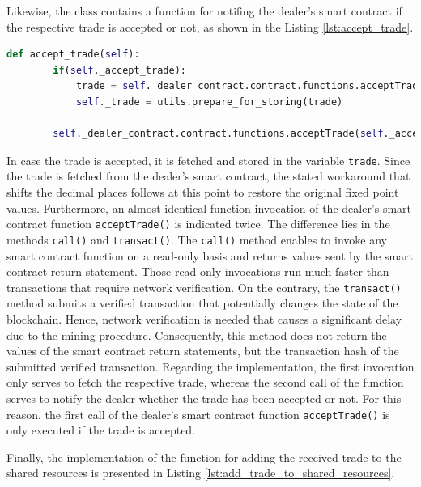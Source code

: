 Likewise, the class contains a function for notifing the dealer's smart contract if the respective trade is accepted or not,
as shown in the Listing \ref{lst:accept_trade}.

\begin{lstlisting}[float=htbp, label=lst:accept_trade, caption=Notification of trade acceptance, language=Python]
    def accept_trade(self):
        if(self._accept_trade):
            trade = self._dealer_contract.contract.functions.acceptTrade(self._accept_trade).call({'from': self._account_address})
            self._trade = utils.prepare_for_storing(trade)

        self._dealer_contract.contract.functions.acceptTrade(self._accept_trade).transact({'from': self._account_address})

\end{lstlisting}

In case the trade is accepted, it is fetched and stored in the variable \verb|trade|. Since the trade 
is fetched from the dealer's smart contract, the stated workaround that shifts the decimal places follows
at this point to restore the original fixed point values.
Furthermore, an almost identical function invocation of the dealer's smart contract 
function \verb|acceptTrade()| is indicated twice. 
The difference lies in the methods \verb|call()| and \verb|transact()|. 
The \verb|call()| method enables to invoke any smart contract function on a read-only basis
and returns values sent by the smart contract return statement. 
Those read-only invocations run much faster than transactions that require network verification.
On the contrary, the \verb|transact()| method submits a verified transaction that potentially changes the state of the blockchain. 
Hence, network verification is needed that causes a significant delay due to the mining procedure.
Consequently, this method does not return the values of the smart contract return statements,
but the transaction hash of the submitted verified transaction.
Regarding the implementation, the first invocation only serves to fetch the respective trade,
whereas the second call of the function serves to notify the dealer whether the trade has been accepted or not.
For this reason, the first call of the dealer's smart contract function \verb|acceptTrade()| 
is only executed if the trade is accepted. 

Finally, the implementation of the function for adding the received trade to the shared resources is presented 
in Listing \ref{lst:add_trade_to_shared_resources}.

